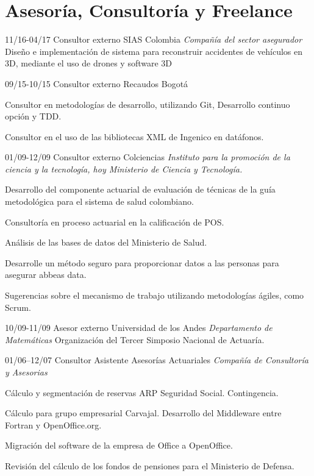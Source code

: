 \section{Asesoría, Consultoría y Freelance}
\begin{entrylist}

  \entry
	{11/16-04/17}
	{Consultor externo}
	{SIAS Colombia {\sl Compañía del sector asegurador}}
	{Diseño e implementación de sistema para reconstruir accidentes de vehículos en 3D,
	mediante el uso de drones y software 3D}

  \entry
	{09/15-10/15}
	{Consultor externo}
	{Recaudos Bogotá}
        {Consultor en metodologías de desarrollo, utilizando Git, Desarrollo continuo
opción y TDD.

	Consultor en el uso de las bibliotecas XML de Ingenico en datáfonos.}

  \entry
	{01/09-12/09}
	{Consultor externo}
	{Colciencias {\sl Instituto para la promoción de la ciencia y la tecnología, hoy Ministerio de Ciencia y Tecnología.}}
        {Desarrollo del componente actuarial de evaluación de técnicas de la guía metodológica para
el sistema de salud colombiano.

Consultoría en proceso actuarial en la calificación de POS.

Análisis de las bases de datos del Ministerio de Salud.

Desarrolle un método seguro para proporcionar datos a las personas para asegurar abbeas data.

Sugerencias sobre el mecanismo de trabajo utilizando metodologías ágiles, como Scrum.}

  \entry
	{10/09-11/09}
	{Asesor externo}
	{Universidad de los Andes {\sl Departamento de Matemáticas}}
	{Organización del Tercer Simposio Nacional de Actuaría.}

  \entry
	{01/06–12/07}
	{Consultor Asistente}
	{Asesorías Actuariales {\sl Compañía de Consultoría y Asesorias}}
	{Cálculo y segmentación de reservas ARP Seguridad Social. Contingencia.

Cálculo para grupo empresarial Carvajal. Desarrollo del Middleware
entre Fortran y OpenOffice.org.

Migración del software de la empresa de Office a OpenOffice.

Revisión del cálculo de los fondos de pensiones para el Ministerio de
Defensa.}

\end{entrylist}


